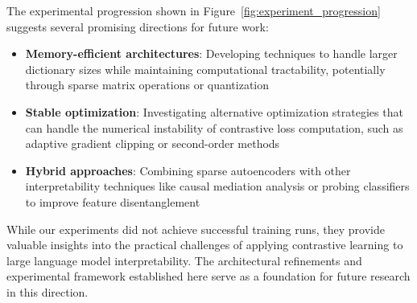 \documentclass{article} %
\begin{document}
The experimental progression shown in Figure~\ref{fig:experiment_progression} suggests several promising directions for future work:

\begin{itemize}
    \item \textbf{Memory-efficient architectures}: Developing techniques to handle larger dictionary sizes while maintaining computational tractability, potentially through sparse matrix operations or quantization
    \item \textbf{Stable optimization}: Investigating alternative optimization strategies that can handle the numerical instability of contrastive loss computation, such as adaptive gradient clipping or second-order methods
    \item \textbf{Hybrid approaches}: Combining sparse autoencoders with other interpretability techniques like causal mediation analysis or probing classifiers to improve feature disentanglement
\end{itemize}

While our experiments did not achieve successful training runs, they provide valuable insights into the practical challenges of applying contrastive learning to large language model interpretability. The architectural refinements and experimental framework established here serve as a foundation for future research in this direction.



\end{document}
